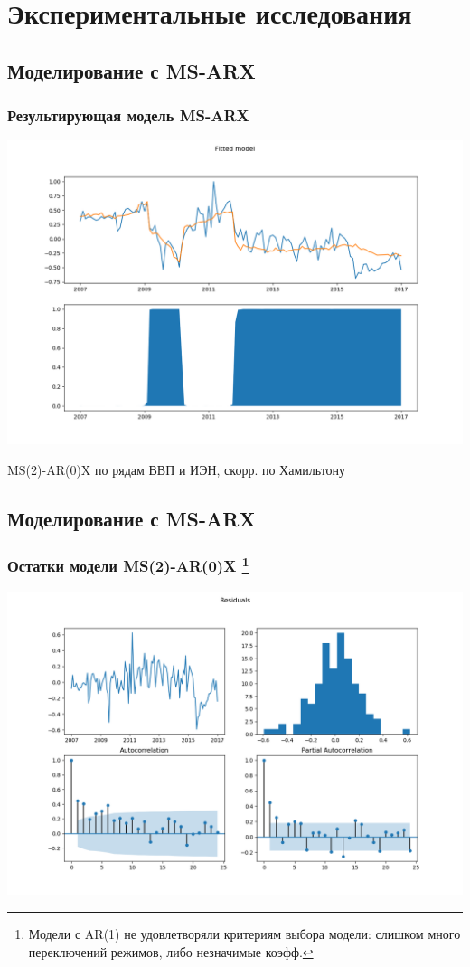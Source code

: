 \documentclass{beamer}
\begin{document}
	\section{Экспериментальные исследования}
		\subsection{Моделирование с MS-ARX}
		\begin{frame}
			\frametitle{Результирующая модель MS-ARX}
			
			\includegraphics[height=0.8\textheight]{m0_fit}
			
			MS(2)-AR(0)X по рядам ВВП и ИЭН, скорр. по Хамильтону
		\end{frame}

		\subsection{Моделирование с MS-ARX}
		\begin{frame}
			\frametitle{Остатки модели MS(2)-AR(0)X
				\footnote{Модели с AR(1) не удовлетворяли критериям выбора модели: слишком много переключений режимов, либо незначимые коэфф.}
			}
			
			\includegraphics[height=0.8\textheight]{m0_resid}
		\end{frame}
	
\end{document}
